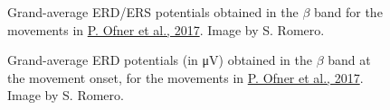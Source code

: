 \documentclass[11pt]{exam}
\begin{document}
    \begin{center} %
        \begin{minipage}[t]{0.8\textwidth} %
            \centering
            \begin{figure}[H] %
                \centering
                \caption{Grand-average ERD/ERS potentials obtained in the \(\beta\) band for the movements in \href{https://doi.org/10.1371/journal.pone.0182578}{P. Ofner et al., 2017}. Image by S. Romero.}
                \label{fig:ERD}
            \end{figure}
        \end{minipage}

        \smallskip %

        \begin{minipage}[t]{\textwidth} %
            \centering
            \begin{figure}[H] %
                \centering
                \caption{Grand-average ERD potentials (in \si{\micro\volt}) obtained in the \(\beta\) band at the movement onset, for the movements in \href{https://doi.org/10.1371/journal.pone.0182578}{P. Ofner et al., 2017}. Image by S. Romero.}
                \label{fig:ERDtopo}
            \end{figure}
        \end{minipage}
    \end{center}
\end{document}
